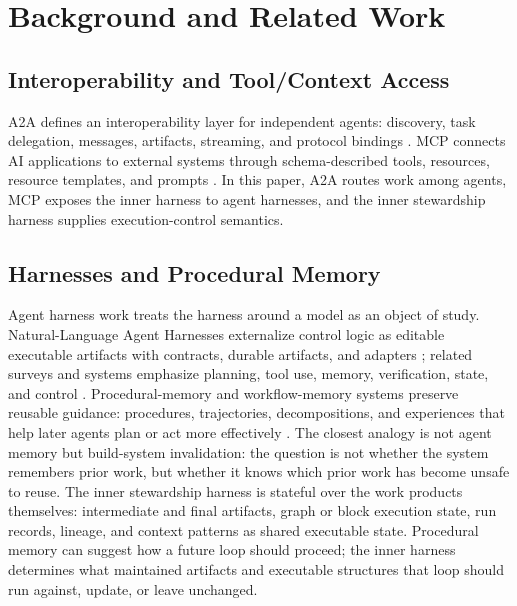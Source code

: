 \documentclass{article}
\begin{document}
\section{Background and Related Work}

\subsection{Interoperability and Tool/Context Access}

A2A defines an interoperability layer for independent agents: discovery, task delegation, messages, artifacts, streaming, and protocol bindings \cite{a2a2026spec}. MCP connects AI applications to external systems through schema-described tools, resources, resource templates, and prompts \cite{mcp2025intro,mcp2025tools,mcp2025resources,mcp2025prompts}. In this paper, A2A routes work among agents, MCP exposes the inner harness to agent harnesses, and the inner stewardship harness supplies execution-control semantics.

\subsection{Harnesses and Procedural Memory}

Agent harness work treats the harness around a model as an object of study. Natural-Language Agent Harnesses externalize control logic as editable executable artifacts with contracts, durable artifacts, and adapters \cite{pan2026nlah}; related surveys and systems emphasize planning, tool use, memory, verification, state, and control \cite{ning2026codeharness,lou2026autoharness,zhang2025harness}. Procedural-memory and workflow-memory systems preserve reusable guidance: procedures, trajectories, decompositions, and experiences that help later agents plan or act more effectively \cite{wang2024awm,fang2025memp,fan2024workflowllm,han2025legomem,yan2025memoryr1,borro2026memori}. The closest analogy is not agent memory but build-system invalidation: the question is not whether the system remembers prior work, but whether it knows which prior work has become unsafe to reuse. The inner stewardship harness is stateful over the work products themselves: intermediate and final artifacts, graph or block execution state, run records, lineage, and context patterns as shared executable state. Procedural memory can suggest how a future loop should proceed; the inner harness determines what maintained artifacts and executable structures that loop should run against, update, or leave unchanged.
\end{document}
